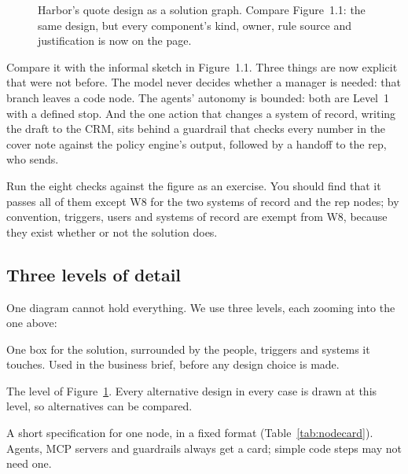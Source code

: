 \begin{figure}[htbp]
\caption{Harbor's quote design as a solution graph. Compare Figure~1.1: the same design, but every component's kind, owner, rule source and justification is now on the page.}
\label{fig:quote-graph}
\end{figure}

Compare it with the informal sketch in Figure~1.1. Three things are now explicit that were not before. The model never decides whether a manager is needed: that branch leaves a code node. The agents' autonomy is bounded: both are Level~1 with a defined stop. And the one action that changes a system of record, writing the draft to the CRM, sits behind a guardrail that checks every number in the cover note against the policy engine's output, followed by a handoff to the rep, who sends.

Run the eight checks against the figure as an exercise. You should find that it passes all of them except W8 for the two systems of record and the rep nodes; by convention, triggers, users and systems of record are exempt from W8, because they exist whether or not the solution does.

\subsection{Three levels of detail}

One diagram cannot hold everything. We use three levels, each zooming into the one above:
\begin{description}[leftmargin=1em,itemsep=2pt]
  \item[Context view.] One box for the solution, surrounded by the people, triggers and systems it touches. Used in the business brief, before any design choice is made.
  \item[Solution graph.] The level of Figure~\ref{fig:quote-graph}. Every alternative design in every case is drawn at this level, so alternatives can be compared.
  \item[Node card.] A short specification for one node, in a fixed format (Table~\ref{tab:nodecard}). Agents, MCP servers and guardrails always get a card; simple code steps may not need one.
\end{description}

